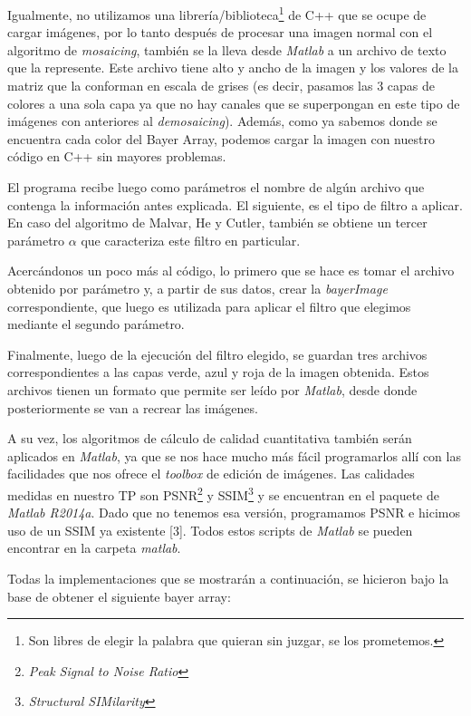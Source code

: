 Igualmente, no utilizamos una librería/biblioteca\footnote{Son libres de elegir la palabra que quieran sin juzgar, se los prometemos.} de C++ que se ocupe de cargar imágenes, por lo tanto después de procesar una imagen normal con el algoritmo de \textit{mosaicing}, también se la lleva desde \textit{Matlab} a un archivo de texto que la represente. Este archivo tiene alto y ancho de la imagen y los valores de la matriz que la conforman en escala de grises (es decir, pasamos las 3 capas de colores a una sola capa ya que no hay canales que se superpongan en este tipo de imágenes con anteriores al \textit{demosaicing}). Además, como ya sabemos donde se encuentra cada color del Bayer Array, podemos cargar la imagen con nuestro código en C++ sin mayores problemas.

El programa recibe luego como parámetros el nombre de algún archivo que contenga la información antes explicada. El siguiente, es el tipo de filtro a aplicar. En caso del algoritmo de Malvar, He y Cutler, también se obtiene un tercer parámetro \textbf{$\alpha$} que caracteriza este filtro en particular.

Acercándonos un poco más al código, lo primero que se hace es tomar el archivo obtenido por parámetro y, a partir de sus datos, crear la \textit{bayerImage} correspondiente, que luego es utilizada para aplicar el filtro que elegimos mediante el segundo parámetro.

Finalmente, luego de la ejecución del filtro elegido, se guardan tres archivos correspondientes a las capas verde, azul y roja de la imagen obtenida. Estos archivos tienen un formato que permite ser leído por \textit{Matlab}, desde donde posteriormente se van a recrear las imágenes.

A su vez, los algoritmos de cálculo de calidad cuantitativa también serán aplicados en \textit{Matlab}, ya que se nos hace mucho más fácil programarlos allí con las facilidades que nos ofrece el \textit{toolbox} de edición de imágenes. Las calidades medidas en nuestro TP son PSNR\footnote{\textit{Peak Signal to Noise Ratio}} y SSIM\footnote{\textit{Structural SIMilarity}} y se encuentran en el paquete de \textit{Matlab R2014a}. Dado que no tenemos esa versión, programamos PSNR e hicimos uso de un SSIM ya existente [3]. Todos estos scripts de \textit{Matlab} se pueden encontrar en la carpeta \textit{matlab}.

\vspace{2\baselineskip}

Todas la implementaciones que se mostrarán a continuación, se hicieron bajo la base de obtener el siguiente bayer array:


